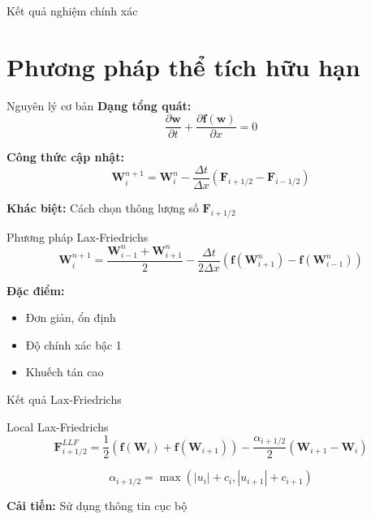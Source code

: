 \documentclass[aspectratio=169,22pt]{beamer}
\begin{document}
\begin{frame}{Kết quả nghiệm chính xác}
\begin{center}
\scalebox{0.9}{}
\end{center}
\end{frame}

\section{Phương pháp thể tích hữu hạn}

\begin{frame}{Nguyên lý cơ bản}
\textbf{Dạng tổng quát:}
$$\frac{\partial \mathbf{w}}{\partial t} + \frac{\partial \mathbf{f}(\mathbf{w})}{\partial x} = 0$$

\textbf{Công thức cập nhật:}
$$\mathbf{W}_i^{n+1} = \mathbf{W}_i^n - \frac{\Delta t}{\Delta x} \left( \mathbf{F}_{i+1/2} - \mathbf{F}_{i-1/2} \right)$$

\textbf{Khác biệt:} Cách chọn thông lượng số $\mathbf{F}_{i+1/2}$
\end{frame}

\begin{frame}{Phương pháp Lax-Friedrichs}
$$\mathbf{W}_i^{n+1} = \frac{\mathbf{W}_{i-1}^n + \mathbf{W}_{i+1}^n}{2} - \frac{\Delta t}{2\Delta x} \left( \mathbf{f}(\mathbf{W}_{i+1}^n) - \mathbf{f}(\mathbf{W}_{i-1}^n) \right)$$

\vspace{1cm}
\textbf{Đặc điểm:}
\begin{itemize}
\item Đơn giản, ổn định
\item Độ chính xác bậc 1
\item Khuếch tán cao
\end{itemize}
\end{frame}

\begin{frame}{Kết quả Lax-Friedrichs}
\begin{center}
\scalebox{0.9}{}
\end{center}
\end{frame}

\begin{frame}{Local Lax-Friedrichs}
$$\mathbf{F}_{i+1/2}^{LLF} = \frac{1}{2} \left( \mathbf{f}(\mathbf{W}_i) + \mathbf{f}(\mathbf{W}_{i+1}) \right) - \frac{\alpha_{i+1/2}}{2} \left( \mathbf{W}_{i+1} - \mathbf{W}_i \right)$$

$$\alpha_{i+1/2} = \max \left( |u_i| + c_i, |u_{i+1}| + c_{i+1} \right)$$

\vspace{0.5cm}
\textbf{Cải tiến:} Sử dụng thông tin cục bộ
\end{frame}
\end{document}

